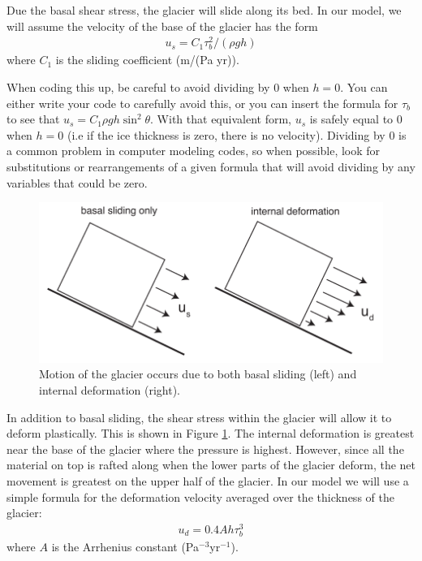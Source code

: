 \documentclass[11pt, oneside]{article}   	%
\begin{document}
Due the basal shear stress, the glacier will slide along its bed. In our model, we will assume the velocity of the base of the glacier has the form
\begin{eqnarray}
	u_s = C_1  \tau_b^2 / (\rho g h) 
	\label{eq:us}
\end{eqnarray}
where $C_1$ is the sliding coefficient (m/(Pa yr)).  

When coding this up, be careful to avoid dividing by 0 when $h=0$. You can either write your code to carefully avoid this, or you can insert  the formula for $\tau_b$ to see that $u_s = C_1 \rho g h \sin^2\theta
$. With that equivalent form, $u_s$ is safely equal to $0$ when $h=0$ (i.e if the ice thickness is zero, there is no velocity).  Dividing by 0 is a common problem in computer modeling codes, so when possible, look for substitutions or rearrangements of a given formula that will avoid dividing by any variables that could be zero.

\begin{figure}[htbp]
\begin{center}
\includegraphics[width=.8\textwidth]{sliding_deformation.pdf}
\caption{Motion of the glacier occurs due to both basal sliding (left) and internal deformation (right).}
\label{fig:sliding}
\end{center}
\end{figure}


In addition to  basal sliding, the shear stress within the glacier will allow it to deform  plastically.  This is shown in Figure \ref{fig:sliding}.  The internal deformation is greatest near the base of the glacier where the pressure is highest. However, since all the material on top is rafted along when the lower parts of the glacier deform, the net movement is greatest on the upper half of the glacier. In our model we will use a simple formula for the deformation velocity averaged over the thickness of the glacier:
\begin{eqnarray}
	u_d = 0.4  A h \tau_b^3
	\label{eq:ud}
\end{eqnarray}
where $ A$ is the Arrhenius constant (Pa$^{-3}$yr$^{-1}$).  
\end{document}
